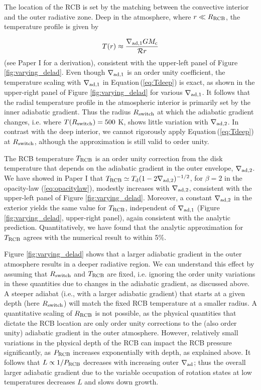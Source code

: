 \documentclass[apj]{emulateapj}
\newcommand{\Eq}[1]{Equation\,(\ref{#1})}
\newcommand{\co}{_{\rm c}}
\newcommand{\di}{_{\rm d}}
\newcommand{\cb}{_{\rm RCB}}
\begin{document}
The location of the RCB is set by the matching between the convective interior and the outer radiative zone. Deep in the atmosphere, where $r \ll R\cb$, the temperature profile is given by 

\begin{equation}
\label{eq:Tdeep}
T(r) \approx \frac{\nabla_{\rm ad,1} G M\co}{\mathcal{R} r}
\end{equation}   
(see Paper I for a derivation), consistent with the upper-left panel of Figure \ref{fig:varying_delad}. Even though $\nabla_{\rm ad,1}$ is an order unity coefficient, the temperature scaling with $\nabla_{\rm ad,1}$ in \Eq{eq:Tdeep} is exact, as shown in the upper-right panel of Figure \ref{fig:varying_delad} for various $\nabla_{\rm ad,1}$. It follows that the radial temperature profile in the atmospheric interior is primarily set by the inner adiabatic gradient. Thus the radius $R_{\rm switch}$ at which the adiabatic gradient changes, i.e. where $T(R_{\rm switch})=500$ K, shows little variation with $\nabla_{\rm ad,2}$. In contrast with the deep interior, we cannot rigorously apply \Eq{eq:Tdeep} at $R_{\rm switch}$, although the approximation is still valid to order unity.

The RCB temperature $T\cb$ is an order unity correction from the disk temperature that depends on the adiabatic gradient in the outer envelope, $\nabla_{\rm ad,2}$.  We have showed in Paper I that $T\cb \simeq T\di (1- 2 \nabla_{\rm ad, 2})^{-1/2}$, for $\beta=2$ in the opacity-law (\ref{eq:opacitylaw}), modestly increases with $\nabla_{\rm ad,2}$, consistent with the upper-left panel of Figure \ref{fig:varying_delad}. Moreover, a constant $\nabla_{\rm ad,2}$ in the exterior yields the same value for $T\cb$, independent of $\nabla_{\rm ad,1}$ (Figure \ref{fig:varying_delad}, upper-right panel), again consistent with the analytic prediction. Quantitatively, we have found that the analytic approximation for $T\cb$ agrees with the numerical result to within 5\%.

Figure \ref{fig:varying_delad} shows that a larger adiabatic gradient in the outer atmosphere results in a deeper radiative region. We can understand this effect by assuming that $R_{\rm switch}$ and $T\cb$ are fixed, i.e. ignoring the order unity variations in these quantities due to changes in the adiabatic gradient, as discussed above. A steeper adiabat (i.e., with a larger adiabatic gradient) that starts at a given depth (here $R_{\rm switch}$) will match the fixed RCB temperature at a smaller radius. A quantitative scaling of $R\cb$ is not possible, as the physical quantities that dictate the RCB location are only order unity corrections to the (also order unity) adiabatic gradient in the outer atmosphere. However, relatively small variations in the physical depth of the RCB can impact the RCB pressure significantly, as $P\cb$ increases exponentially with depth, as explained above. It follows that $L \propto 1/P\cb$ decreases with increasing outer $\nabla_{\rm ad}$; thus the overall larger adiabatic gradient due to the variable occupation of rotation states at low temperatures decreases $L$ and slows down growth. 
\end{document}
